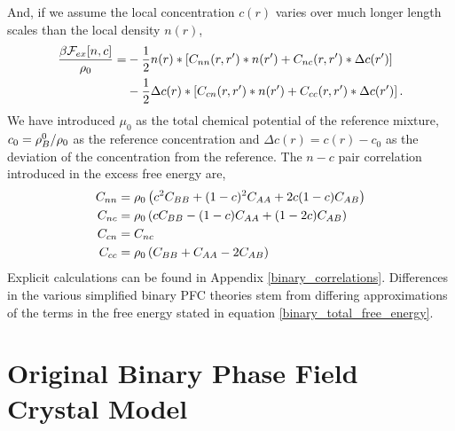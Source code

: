 %
And, if we assume the local concentration $c(r)$ varies over much longer length
scales than the local density $n(r)$,
%
\begin{align}
    \label{binary_excess}
    \frac{\beta\mathcal{F}_{ex}[n, c]}{\rho_0}
        = &-\frac{1}{2} n(r) \ast \left[ 
            C_{nn}(r, r^\prime) \ast n(r^\prime) 
          + C_{nc}(r, r^\prime) \ast \Delta c(r^\prime)\right] \\
        &-\frac{1}{2} \Delta c(r) \ast \left[
            C_{cn}(r, r^\prime) \ast n(r^\prime) 
          + C_{cc}(r, r^\prime) \ast \Delta c(r^\prime)\right]. \nonumber
\end{align}
%
We have introduced $\mu_0$ as the total chemical potential of the reference
mixture, $c_0 = \rho_B^0 / \rho_0$ as the reference concentration and $\Delta c(r)
= c(r) - c_0$ as the deviation of the concentration from the reference.  The
$n-c$ pair correlation introduced in the excess free energy are,
%
\begin{align}
    C_{nn} &= \rho_0\left(c^2 C_{BB} + (1 - c)^2C_{AA} + 2c(1-c)C_{AB}\right) \\
    C_{nc} &= \rho_0\left(c C_{BB} - (1 - c) C_{AA} + (1 - 2c)C_{AB}\right) \\
    C_{cn} &= C_{nc} \\
    C_{cc} &= \rho_0\left(C_{BB} + C_{AA} - 2 C_{AB}\right)
\end{align}
%
Explicit calculations can be found in Appendix \ref{binary_correlations}.
Differences in the various simplified binary PFC theories stem from differing
approximations of the terms in the free energy stated in equation
\ref{binary_total_free_energy}.

\section{Original Binary Phase Field Crystal Model} %

